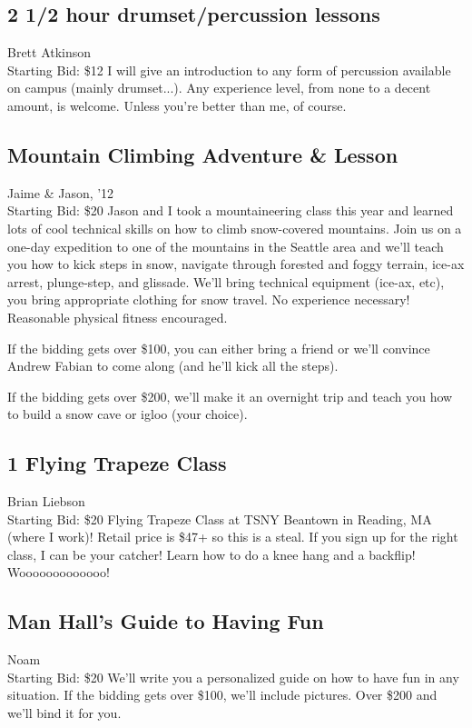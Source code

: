 \documentclass[11pt]{article}
\begin{document}
\subsection{2 1/2 hour drumset/percussion lessons}
Brett Atkinson
\\
Starting Bid: \$12
\newline
I will give an introduction to any form of percussion available on campus (mainly drumset...). Any experience level, from none to a decent amount, is welcome. Unless you're better than me, of course.
\subsection{Mountain Climbing Adventure \& Lesson}
Jaime \& Jason, '12
\\
Starting Bid: \$20
\newline
Jason and I took a mountaineering class this year and learned lots of cool technical skills on how to climb snow-covered mountains. Join us on a one-day expedition to one of the mountains in the Seattle area and we'll teach you how to kick steps in snow, navigate through forested and foggy terrain, ice-ax arrest, plunge-step, and glissade. We'll bring technical equipment (ice-ax, etc), you bring appropriate clothing for snow travel. No experience necessary! Reasonable physical fitness encouraged.

If the bidding gets over \$100, you can either bring a friend or we'll convince Andrew Fabian to come along (and he'll kick all the steps).

If the bidding gets over \$200, we'll make it an overnight trip and teach you how to build a snow cave or igloo (your choice).
\subsection{1 Flying Trapeze Class}
Brian Liebson
\\
Starting Bid: \$20
\newline
Flying Trapeze Class at TSNY Beantown in Reading, MA (where I work)! Retail price is \$47+ so this is a steal. If you sign up for the right class, I can be your catcher! Learn how to do a knee hang and a backflip! Wooooooooooooo!
\subsection{Man Hall's Guide to Having Fun}
Noam
\\
Starting Bid: \$20
\newline
We'll write you a personalized guide on how to have fun in any situation. If the bidding gets over \$100, we'll include pictures. Over \$200 and we'll bind it for you.
\end{document}
